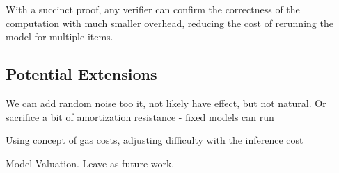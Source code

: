 With a succinct proof, any verifier can confirm the correctness of the computation with much smaller overhead, reducing the cost of rerunning the model for multiple items.





\subsection{Potential Extensions}
We can add random noise too it, not likely have effect, but not natural.
Or sacrifice a bit of amortization resistance - fixed models can run

Using concept of gas costs, adjusting difficulty with the inference cost

Model Valuation. Leave as future work.